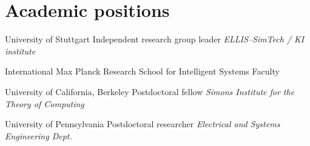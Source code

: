 \documentclass{cvlfoc}
\author[Luiz F.\ O.\ Chamon --- CV]{Luiz F.\ O.\ Chamon}
\begin{document}
\maketitle



%
%
%
%



\section*{Academic positions}

\begin{entrydate}
		{University of Stuttgart}
		{Independent research group leader}
		{\emph{ELLIS--SimTech / KI institute}}

		{International Max Planck Research School for Intelligent Systems}
		{Faculty}
		{}

		{University of California, Berkeley}
		{Postdoctoral fellow}
		{\emph{Simons Institute for the Theory of Computing}}

		{University of Pennsylvania}
		{Postdoctoral researcher}
		{\emph{Electrical and Systems Engineering Dept.}}
\end{entrydate}
\end{document}
